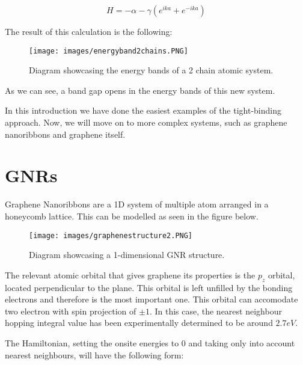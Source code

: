 \documentclass[a4paper,12pt]{report}
\begin{document}
$$ H = - \alpha -\gamma(e^{ika} + e^{-ika}) $$

The result of this calculation is the following:

\begin{figure}[h]
	\begin{center}
		\texttt{[image: images/energyband2chains.PNG]}
	\end{center}
	\caption{Diagram showcasing the energy bands of a 2 chain atomic system.} 
	\label{fig:2chainsenergybands}
\end{figure}

As we can see, a band gap opens in the energy bands of this new system. 

In this introduction we have done the easiest examples of the tight-binding approach. Now, we will move on to more complex systems, such as graphene nanoribbons and graphene itself.



\chapter{GNRs}

Graphene Nanoribbons are a 1D system of multiple atom arranged in a honeycomb lattice. This can be modelled as seen in the figure below.

\begin{figure}[h]
	\begin{center}
		\texttt{[image: images/graphenestructure2.PNG]}
	\end{center}
	\caption{Diagram showcasing a 1-dimensional GNR structure.} 
	\label{fig:GNRstructure}
\end{figure}

The relevant atomic orbital that gives graphene its properties is the $p_z$ orbital, located perpendicular to the plane. This orbital is left unfilled by the bonding electrons and therefore is the most important one. This orbital can accomodate two electron with spin projection of $\pm 1$. In this case, the nearest neighbour hopping integral value has been experimentally determined to be around $2.7 eV$.

The Hamiltonian, setting the onsite energies to 0 and taking only into account nearest neighbours, will have the following form: 
\end{document}
